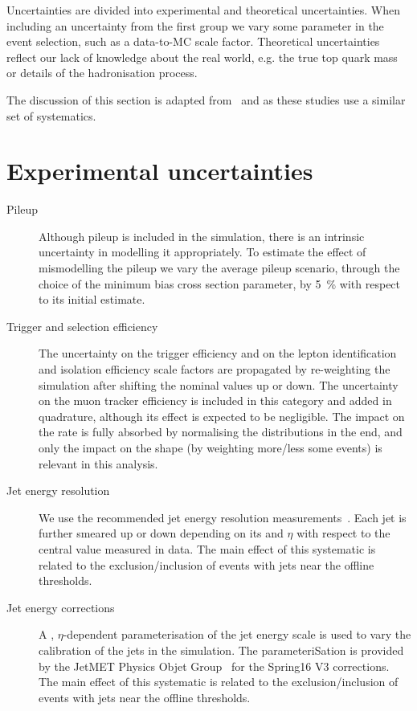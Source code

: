 Uncertainties are divided into experimental and theoretical uncertainties. When including an uncertainty from the first group we vary some parameter in the event selection, such as a data-to-MC scale factor. Theoretical uncertainties reflect our lack of knowledge about the real world, e.g. the true top quark mass or details of the hadronisation process.

The discussion of this section is adapted from~\cite{CMS-AN-2017-175} and \cite{CMS-AN-2017-159} as these studies use a similar set of systematics.

\section{Experimental uncertainties}
\begin{description}
\item[Pileup] Although pileup is included in the simulation, there is an intrinsic uncertainty in modelling it appropriately. To estimate the effect of mismodelling the pileup we vary the average pileup scenario, through the choice of the minimum bias cross section parameter, by 5~\% with respect to its initial estimate. 

\item[Trigger and selection efficiency] The uncertainty on the trigger efficiency and on the lepton identification and isolation efficiency scale factors are propagated by re-weighting the simulation after shifting the nominal values up or down. The uncertainty on the muon tracker efficiency is included in this category and added in quadrature, although its effect is expected to be negligible.  The impact on the rate is fully absorbed by normalising the distributions in the end, and only the impact on the shape (by weighting more/less some events) is relevant in this analysis.

\item[Jet energy resolution] We use the recommended jet energy resolution measurements~\cite{twiki:JER}. Each jet is further smeared up or down depending on its \pt and $\eta$ with respect to the central value measured in data. The main effect of this systematic is related to the exclusion/inclusion of events with jets near the offline thresholds.
  
\item[Jet energy corrections] A \pt, $\eta$-dependent parameterisation of the jet energy scale is used to vary the calibration of the jets in the simulation. The parameteriSation is provided by the JetMET Physics Objet Group~\cite{twiki:JES} for the Spring16 V3 corrections. The main effect of this systematic is related to the exclusion/inclusion of events with jets near the offline thresholds.


\end{description}
